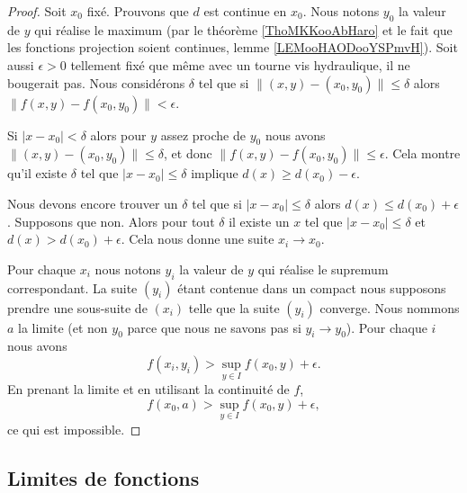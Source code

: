 \begin{proof}
    Soit \( x_0\) fixé. Prouvons que \( d\) est continue en \( x_0\). Nous notons \( y_0\) la valeur de \( y\) qui réalise le maximum (par le théorème \ref{ThoMKKooAbHaro} et le fait que les fonctions projection soient continues, lemme \ref{LEMooHAODooYSPmvH}). Soit aussi \( \epsilon>0\) tellement fixé que même avec un tourne vis hydraulique, il ne bougerait pas. Nous considérons \( \delta\) tel que si \( \| (x,y)-(x_0,y_0) \|\leq \delta\) alors \( \| f(x,y)-f(x_0,y_0) \|<\epsilon\).

    Si \( | x-x_0 |<\delta\) alors pour \( y\) assez proche de \( y_0\) nous avons \( \| (x,y)-(x_0,y_0) \|\leq \delta\), et donc \( \| f(x,y)-f(x_0,y_0) \|\leq \epsilon \). Cela montre qu'il existe \( \delta\) tel que \( | x-x_0 |\leq \delta\) implique \( d(x)\geq d(x_0)-\epsilon\).

    Nous devons encore trouver un \( \delta\) tel que si \( | x-x_0 |\leq \delta\) alors \( d(x)\leq d(x_0)+\epsilon\). Supposons que non. Alors pour tout \( \delta\) il existe un \( x\) tel que \( | x-x_0 |\leq \delta\) et \( d(x)> d(x_0)+\epsilon\). Cela nous donne une suite \( x_i\to x_0\).

    Pour chaque \( x_i\) nous notons \( y_i\) la valeur de \( y\) qui réalise le supremum correspondant. La suite \( (y_i)\) étant contenue dans un compact nous supposons prendre une sous-suite de \( (x_i)\) telle que la suite \( (y_i)\) converge. Nous nommons \( a\) la limite (et non \( y_0\) parce que nous ne savons pas si \( y_i\to y_0\)). Pour chaque \( i\) nous avons
    \begin{equation}
        f(x_i,y_i)>\sup_{y\in I}f(x_0,y)+\epsilon.
    \end{equation}
    En prenant la limite et en utilisant la continuité de \( f\),
    \begin{equation}
        f(x_0,a)>\sup_{y\in I} f(x_0,y)+\epsilon,
    \end{equation}
    ce qui est impossible.
\end{proof}

\subsection{Limites de fonctions}


